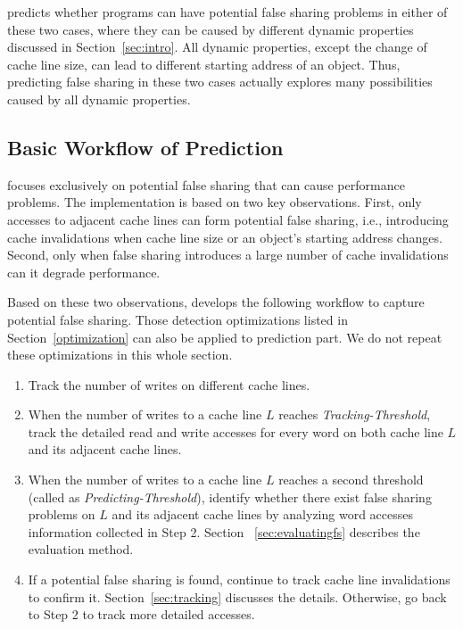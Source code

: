\Predator{} predicts whether programs can have potential false sharing problems  
in either of these two cases, where they can be caused by different dynamic properties 
discussed in Section~\ref{sec:intro}.
All dynamic properties, except the change of cache line size,
can lead to different starting address of an object. 
Thus, predicting false sharing in these two cases actually 
explores many possibilities caused by all dynamic properties.

\subsection{Basic Workflow of Prediction}
\label{sec:predictionmechanism} 

\Predator{} focuses exclusively on potential false sharing that can 
cause performance problems.
The implementation is based on
two key observations. First, only accesses to 
adjacent cache lines can form potential false sharing, 
i.e., introducing cache invalidations when cache line size
or an object's starting address changes.
Second, only when false sharing introduces a large number of cache invalidations
can it degrade performance.

Based on these two observations, \Predator{} develops 
the following workflow to capture potential false sharing.
Those detection optimizations listed in Section~\ref{optimization} can also be applied
to prediction part. We do not repeat these optimizations in
this whole section.

\begin{enumerate}
\item
Track the number of writes on different cache lines. 

\item
When the number of writes to a cache line $L$ reaches {\it Tracking-Threshold},
track the detailed read and write accesses for every word on both cache line $L$ 
and its adjacent cache lines. 

\item
When the number of writes to a cache line $L$ reaches a second threshold (called as
{\it Predicting-Threshold}), 
identify whether there exist false sharing problems on $L$ and its adjacent 
cache lines by analyzing word accesses information collected in Step 2. 
Section ~\ref{sec:evaluatingfs} describes the evaluation method.

\item
If a potential false sharing is found, continue to track cache line invalidations
to confirm it. Section~\ref{sec:tracking} discusses the details.
Otherwise, go back to Step 2 to track more detailed accesses.
 
\end{enumerate}

